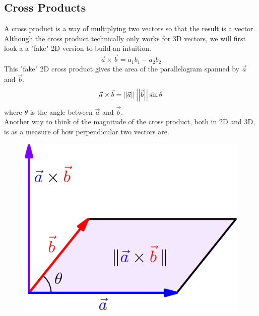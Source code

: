 \subsection{Cross Products}
\noindent
A cross product is a way of multiplying two vectors so that the result is a vector. Although the cross product technically only works for 3D vectors, we will first look a a "fake" 2D version to build an intuition.
\begin{equation*}
	\vec{a}\times\vec{b} = a_1b_1-a_2b_2
\end{equation*}
This "fake" 2D cross product gives the area of the parallelogram spanned by $\vec{a}$ and $\vec{b}$.
\begin{equation*}
	\vec{a}\times\vec{b} = \left|\left|\vec{a}\right|\right|\left|\left|\vec{b}\right|\right|\sin{\theta}	
\end{equation*}
where $\theta$ is the angle between $\vec{a}$ and $\vec{b}$.\\
Another way to think of the magnitude of the cross product, both in 2D and 3D, is as a measure of how perpendicular two vectors are.

\begin{figure}[h]
	\centering
	\includegraphics[scale=0.33]{Images/backgroundReview/CrossProduct}
\end{figure}

